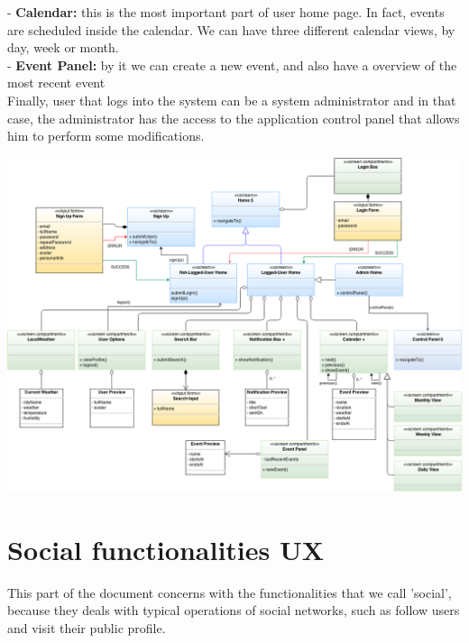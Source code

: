 \documentclass[12pt]{book}
\begin{document}
- \textbf{Calendar: }this is the most important part of user home page. In fact, events are scheduled inside the calendar. We can have three different calendar views, by day, week or month. \\

- \textbf{Event Panel: }by it we can create a new event, and also have a overview of the most recent event  \\

Finally, user that logs into the system can be a system administrator and in that case, the administrator has the access to the application control panel that allows him to perform some modifications. \\
\newpage
\begin{landscape}
\begin{center}
\includegraphics[scale=0.5]{homes_UX}\\
\end{center}
\end{landscape}

\section{Social functionalities UX}
This part of the document concerns with the functionalities that we call 'social', because they deals with typical operations of social networks, such as follow users and visit their public profile. 
\end{document}
